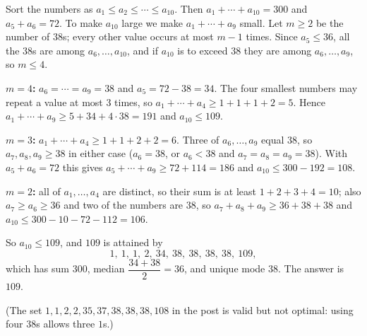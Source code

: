 Sort the numbers as $a_1\le a_2\le\cdots\le a_{10}$. Then $a_1+\cdots+a_{10}=300$ and $a_5+a_6=72$. To make $a_{10}$ large we make $a_1+\cdots+a_9$ small. Let $m\ge2$ be the number of $38$s; every other value occurs at most $m-1$ times. Since $a_5\le36$, all the $38$s are among $a_6,\dots,a_{10}$, and if $a_{10}$ is to exceed $38$ they are among $a_6,\dots,a_9$, so $m\le4$.

\textbf{$m=4$:} $a_6=\cdots=a_9=38$ and $a_5=72-38=34$. The four smallest numbers may repeat a value at most $3$ times, so $a_1+\cdots+a_4\ge1+1+1+2=5$. Hence $a_1+\cdots+a_9\ge5+34+4\cdot38=191$ and $a_{10}\le109$.

\textbf{$m=3$:} $a_1+\cdots+a_4\ge1+1+2+2=6$. Three of $a_6,\dots,a_9$ equal $38$, so $a_7,a_8,a_9\ge38$ in either case ($a_6=38$, or $a_6<38$ and $a_7=a_8=a_9=38$). With $a_5+a_6=72$ this gives $a_5+\cdots+a_9\ge72+114=186$ and $a_{10}\le300-192=108$.

\textbf{$m=2$:} all of $a_1,\dots,a_4$ are distinct, so their sum is at least $1+2+3+4=10$; also $a_7\ge a_6\ge36$ and two of the numbers are $38$, so $a_7+a_8+a_9\ge36+38+38$ and $a_{10}\le300-10-72-112=106$.

So $a_{10}\le109$, and $109$ is attained by
\[
1,\ 1,\ 1,\ 2,\ 34,\ 38,\ 38,\ 38,\ 38,\ 109,
\]
which has sum $300$, median $\dfrac{34+38}{2}=36$, and unique mode $38$. The answer is $\boxed{109}$.

(The set $1,1,2,2,35,37,38,38,38,108$ in the post is valid but not optimal: using four $38$s allows three $1$s.)
